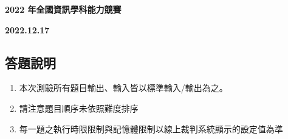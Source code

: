 \thispagestyle{empty}
\setcounter{page}{0}

\vspace*{4em}

\begin{center}
{\bfseries\Huge{2022 年全國資訊學科能力競賽}}\\
\end{center}
\begin{center}
{\bfseries\LARGE{2022.12.17}}
\end{center}

\vspace*{2em}
\subsection*{答題說明}

{\large
\begin{enumerate}
\item 本次測驗所有題目輸出、輸入皆以標準輸入/輸出為之。
\item 請注意題目順序未依照難度排序
\item 每一題之執行時限限制與記憶體限制以線上裁判系統顯示的設定值為準
\end{enumerate}
}

\vspace*{2em}
\begin{center}
\end{center}

\newpage
